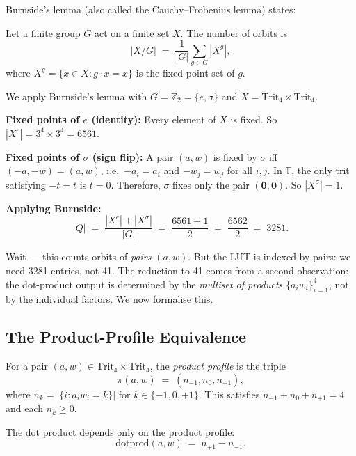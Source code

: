 Burnside's lemma (also called the Cauchy--Frobenius lemma) states:

\begin{lemma}[Burnside]
\label{lem:burnside}
Let a finite group \(G\) act on a finite set \(X\).  The number of
orbits is
\[
  |X/G| \;=\; \frac{1}{|G|} \sum_{g \in G} |X^g|,
\]
where \(X^g = \{x \in X : g \cdot x = x\}\) is the fixed-point set
of \(g\).
\end{lemma}

We apply Burnside's lemma with \(G = \mathbb{Z}_2 = \{e, \sigma\}\)
and \(X = \mathrm{Trit}_4 \times \mathrm{Trit}_4\).

\textbf{Fixed points of \(e\) (identity):}
Every element of \(X\) is fixed.  So \(|X^e| = 3^4 \times 3^4 = 6561\).

\textbf{Fixed points of \(\sigma\) (sign flip):}
A pair \((a,w)\) is fixed by \(\sigma\) iff \((-a,-w) = (a,w)\),
i.e.\ \(-a_i = a_i\) and \(-w_j = w_j\) for all \(i,j\).
In \(\mathbb{T}\), the only trit satisfying \(-t = t\) is \(t = 0\).
Therefore, \(\sigma\) fixes only the pair \((\mathbf{0}, \mathbf{0})\).
So \(|X^\sigma| = 1\).

\textbf{Applying Burnside:}
\[
  |Q| \;=\; \frac{|X^e| + |X^\sigma|}{|G|}
       \;=\; \frac{6561 + 1}{2}
       \;=\; \frac{6562}{2}
       \;=\; 3281.
\]

Wait --- this counts orbits of \emph{pairs} \((a,w)\).  But the LUT is
indexed by pairs: we need 3281 entries, not 41.  The reduction to 41
comes from a second observation: the dot-product output is determined by
the \emph{multiset of products} \(\{a_i w_i\}_{i=1}^4\), not by the
individual factors.  We now formalise this.

\subsection{The Product-Profile Equivalence}
\label{subsec:product_profile}

\begin{definition}
\label{def:product_profile}
For a pair \((a,w) \in \mathrm{Trit}_4 \times \mathrm{Trit}_4\), the
\emph{product profile} is the triple
\[
  \pi(a,w) \;=\; (n_{-1}, n_0, n_{+1}),
\]
where \(n_k = |\{i : a_i w_i = k\}|\) for \(k \in \{-1,0,+1\}\).
This satisfies \(n_{-1} + n_0 + n_{+1} = 4\) and each \(n_k \geq 0\).
\end{definition}

The dot product depends only on the product profile:
\[
  \mathrm{dotprod}(a,w) \;=\; n_{+1} - n_{-1}.
\]

